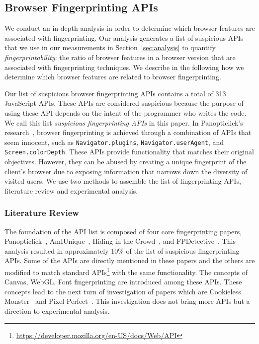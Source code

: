 \subsection{Browser Fingerprinting APIs}
\label{sec:fp-apis}

We conduct an in-depth analysis in order to determine which browser features are associated with fingerprinting. Our analysis generates a list of suspicious APIs that we use in our measurements in Section~\ref{sec:analysis} to quantify \textit{fingerprintability}: the ratio of browser features in a browser version that are associated with fingerprinting techniques. We describe in the following how we determine which browser features are related to browser fingerprinting.

Our list of suspicious browser fingerprinting APIs contains a total of 313 JavaScript APIs. These APIs are considered suspicious because the purpose of using these API depends on the intent of the programmer who writes the code. 
We call this list \textit{suspicious fingerprinting APIs} in this paper.
In Panopticlick's research~\cite{panopticlick}, browser fingerprinting is achieved through a combination of APIs that seem innocent, such as \texttt{Navigator.plugins}, \texttt{Navigator.userAgent}, and \texttt{Screen.colorDepth}. These APIs provide functionality that matches their original objectives. However, they can be abused by creating a unique fingerprint of the client's browser due to exposing information that narrows down the diversity of visited users. We use two methods to assemble the list of fingerprinting APIs, literature review and experimental analysis.

\subsubsection{Literature Review}

The foundation of the API list is composed of four core fingerprinting papers, Panopticlick~\cite{panopticlick}, AmIUnique~\cite{amiunique}, Hiding in the Crowd~\cite{hidinginthecrowd}, and FPDetective~\cite{fpdetective}. This analysis resulted in approximately 10\% of the list of suspicious fingerprinting APIs. Some of the APIs are directly mentioned in these papers and the others are modified to match standard APIs\footnote{\url{https://developer.mozilla.org/en-US/docs/Web/API}} with the same functionality. The concepts of Canvas, WebGL, Font fingerprinting are introduced among these APIs. These concepts lead to the next turn of investigation of papers which are Cookieless Monster~\cite{cookiemonster-SP13} and Pixel Perfect~\cite{mowery2012pixel}. This investigation does not bring more APIs but a direction to experimental analysis. 

